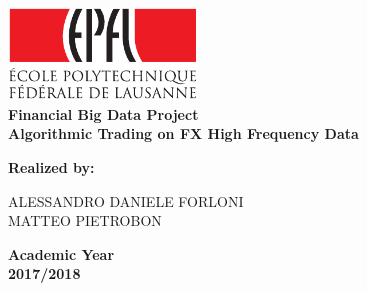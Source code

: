 \documentclass[a4paper]{article}
\begin{document}
\newcommand*\xbar[1]{%
  \hbox{%
    \vbox{%
      \hrule height 0.5pt %
      \kern0.5ex%
      \hbox{%
        \kern-0.1em%
        \ensuremath{#1}%
        \kern-0.5em%
      }%
    }%
  }%
} 

\begin{titlepage}
	\vspace{50mm}
	\begin{center}
		\includegraphics[width=5cm]{Figures/EPFL_LOG.pdf}\\
		\vspace{2cm}
		\vspace{5mm}
		{\LARGE{\bf Financial Big Data Project}}\\
		\vspace{3mm}
		{\large{\bf Algorithmic Trading on FX High Frequency Data}}\\
	\end{center}
	\vspace{60mm}
	\par
	\noindent

			{\large{\bf Realized by: \\
            
            		\vspace{10pt}
                    
					ALESSANDRO DANIELE FORLONI\\
					MATTEO PIETROBON\\
				}}
	
	\vspace{10pt}
	\begin{center}
		{\large{\bf Academic Year\\
				2017/2018 }}
	\end{center}
\end{titlepage}

\newpage
\tableofcontents
\end{document}
